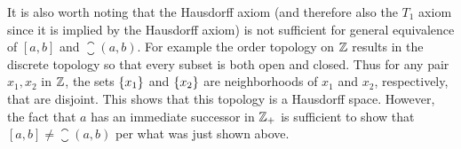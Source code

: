 {  It is also worth noting that the Hausdorff axiom (and therefore also the $T_1$ axiom since it is implied by the Hausdorff axiom) is not sufficient for general equivalence of $[a,b]$ and $\closure{(a,b)}$.
  For example the order topology on ${\mathbb{Z}}$ results in the discrete topology so that every subset is both open and closed.
  Thus for any pair $x_1, x_2$ in ${\mathbb{Z}}$, the sets $\left\{ x_1 \right\}$ and $\left\{ x_2 \right\}$ are neighborhoods of $x_1$ and $x_2$, respectively, that are disjoint.
  This shows that this topology is a Hausdorff space.
  However, the fact that $a$ has an immediate successor in ${{\mathbb{Z}}_+}$ is sufficient to show that $[a,b] \neq \closure{(a,b)}$ per what was just shown above.
}

